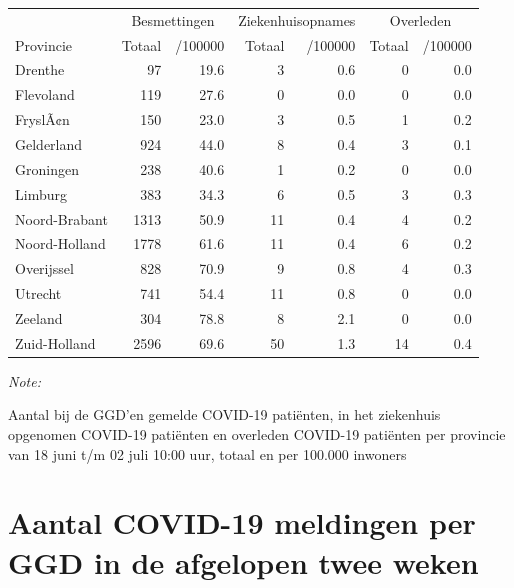 \documentclass[
  english,
  man,floatsintext]{apa6}
\begin{document}
\begin{table}
\centering
\begin{threeparttable}
\begin{tabular}{lrrrrrr}
\toprule
\multicolumn{1}{c}{ } & \multicolumn{2}{c}{Besmettingen} & \multicolumn{2}{c}{Ziekenhuisopnames} & \multicolumn{2}{c}{Overleden} \\
\cmidrule(l{3pt}r{3pt}){2-3} \cmidrule(l{3pt}r{3pt}){4-5} \cmidrule(l{3pt}r{3pt}){6-7}
Provincie & Totaal & /100000 & Totaal & /100000 & Totaal & /100000\\
\midrule
Drenthe & 97 & 19.6 & 3 & 0.6 & 0 & 0.0\\
Flevoland & 119 & 27.6 & 0 & 0.0 & 0 & 0.0\\
FryslÃ¢n & 150 & 23.0 & 3 & 0.5 & 1 & 0.2\\
Gelderland & 924 & 44.0 & 8 & 0.4 & 3 & 0.1\\
Groningen & 238 & 40.6 & 1 & 0.2 & 0 & 0.0\\
Limburg & 383 & 34.3 & 6 & 0.5 & 3 & 0.3\\
Noord-Brabant & 1313 & 50.9 & 11 & 0.4 & 4 & 0.2\\
Noord-Holland & 1778 & 61.6 & 11 & 0.4 & 6 & 0.2\\
Overijssel & 828 & 70.9 & 9 & 0.8 & 4 & 0.3\\
Utrecht & 741 & 54.4 & 11 & 0.8 & 0 & 0.0\\
Zeeland & 304 & 78.8 & 8 & 2.1 & 0 & 0.0\\
Zuid-Holland & 2596 & 69.6 & 50 & 1.3 & 14 & 0.4\\
\bottomrule
\end{tabular}
\begin{tablenotes}
\item \textit{Note: } 
\item Aantal bij de GGD’en gemelde COVID-19 patiënten, in het ziekenhuis opgenomen COVID-19 patiënten en overleden COVID-19 patiënten per provincie van 18 juni t/m 02 juli 10:00 uur, totaal en per 100.000 inwoners
\end{tablenotes}
\end{threeparttable}
\end{table}

\newpage

\hypertarget{aantal-covid-19-meldingen-per-ggd-in-de-afgelopen-twee-weken}{%
\section{Aantal COVID-19 meldingen per GGD in de afgelopen twee weken}\label{aantal-covid-19-meldingen-per-ggd-in-de-afgelopen-twee-weken}}
\end{document}
